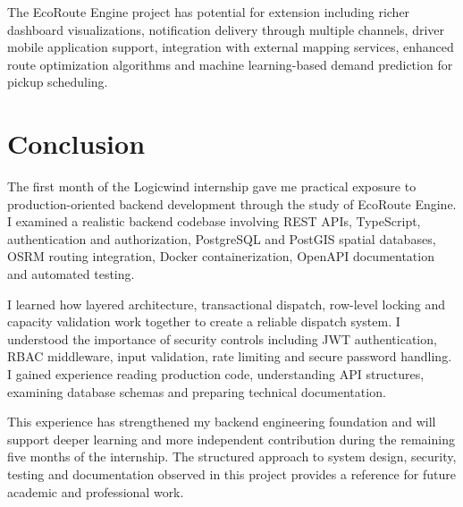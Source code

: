 \documentclass[12pt,a4paper]{report}
\newcommand{\chapterheader}{CHAPTER HEADING}
\begin{document}
The EcoRoute Engine project has potential for extension including richer dashboard visualizations, notification delivery through multiple channels, driver mobile application support, integration with external mapping services, enhanced route optimization algorithms and machine learning-based demand prediction for pickup scheduling.

\section{Conclusion}
The first month of the Logicwind internship gave me practical exposure to production-oriented backend development through the study of EcoRoute Engine. I examined a realistic backend codebase involving REST APIs, TypeScript, authentication and authorization, PostgreSQL and PostGIS spatial databases, OSRM routing integration, Docker containerization, OpenAPI documentation and automated testing.

I learned how layered architecture, transactional dispatch, row-level locking and capacity validation work together to create a reliable dispatch system. I understood the importance of security controls including JWT authentication, RBAC middleware, input validation, rate limiting and secure password handling. I gained experience reading production code, understanding API structures, examining database schemas and preparing technical documentation.

This experience has strengthened my backend engineering foundation and will support deeper learning and more independent contribution during the remaining five months of the internship. The structured approach to system design, security, testing and documentation observed in this project provides a reference for future academic and professional work.
\clearpage

\renewcommand{\chapterheader}{REFERENCES}
\end{document}
